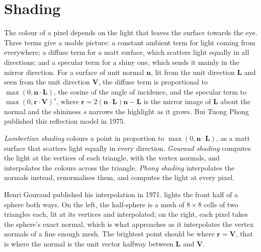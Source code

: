 \section{Shading}\label{sec:b3:computer-graphics:shading}

The colour of a pixel depends on the light that leaves the surface towards the eye. Three terms give a usable picture: a constant ambient term for light coming from everywhere; a diffuse term for a matt surface, which scatters light equally in all directions; and a specular term for a shiny one, which sends it mainly in the mirror direction. For a surface of unit normal $\mathbf n$, lit from the unit direction $\mathbf L$ and seen from the unit direction $\mathbf V$, the diffuse term is proportional to $\max(0, \mathbf n \cdot \mathbf L)$, the cosine of the angle of incidence, and the specular term to $\max(0, \mathbf r \cdot \mathbf V)^s$, where $\mathbf r = 2(\mathbf n \cdot \mathbf L)\mathbf n - \mathbf L$ is the mirror image of $\mathbf L$ about the normal and the shininess $s$ narrows the highlight as it grows. Bui Tuong Phong published this reflection model in 1975. %

\label{lst:b3:computer-graphics:light}

\begin{definition}\label{def:b3:computer-graphics:shading}
\emph{Lambertian shading} colours a point in proportion to $\max(0, \mathbf n \cdot \mathbf L)$, as a matt surface that scatters light equally in every direction. \emph{Gouraud shading} computes the light at the vertices of each triangle, with the vertex normals, and interpolates the colours across the triangle. \emph{Phong shading} interpolates the normals instead, renormalises them, and computes the light at every pixel.
\end{definition}

Henri Gouraud published his interpolation in 1971. %
 lights the front half of a sphere both ways. On the left, the half-sphere is a mesh of $8 \times 8$ cells of two triangles each, lit at its vertices and interpolated; on the right, each pixel takes the sphere's exact normal, which is what  approaches as it interpolates the vertex normals of a fine enough mesh. The brightest point should be where $\mathbf r = \mathbf V$, that is where the normal is the unit vector halfway between $\mathbf L$ and $\mathbf V$.

